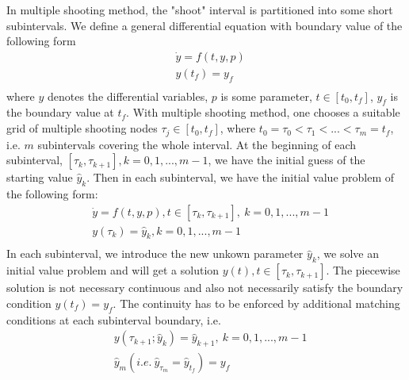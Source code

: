 \documentclass  [
  paper    = a4,
  BCOR     = 10mm,
  twoside,
  fontsize = 12pt,
  fleqn,
  toc      = bibnumbered,
  toc      = listofnumbered,
  numbers  = noendperiod,
  headings = normal,
  listof   = leveldown,
  version  = 3.03
]                                       {scrreprt}
\newcommand{\<}{\langle}
\renewcommand{\>}{\rangle}
\begin{document}
In multiple shooting method, the "shoot" interval is partitioned into some short subintervals. We define a general differential equation with boundary value of the following form
\begin{equation}\label{eqn:ori_dae}
	\begin{aligned}
		& \dot{y} = f(t, y, p) \\ 
		& y(t_f) = y_f  \\
	\end{aligned}
\end{equation}
where $y$ denotes the differential variables, $p$ is some parameter, $t \in [t_0, t_f]$,  $y_f$ is the boundary value at $t_f$.  With multiple shooting method, one chooses a suitable grid of multiple shooting nodes $\tau_j \in [t_0,t_f] $, where $t_0 = \tau_0 < \tau_1 < ... < \tau_m = t_f$,  i.e. $m$ subintervals covering the whole interval. At the beginning of each subinterval, $[\tau_k, \tau_{k+1}], k = 0, 1, ..., m-1$, we have the initial guess of the starting value $\hat{y}_k$. Then in each subinterval, we have the initial value problem of the following form: 
\begin{equation}\label{eqn:msh}
	\begin{aligned}
		& \dot{y} = f(t, y, p) , t \in [\tau_k, \tau_{k+1}], \ k = 0, 1, ..., m-1   \\ 
		& y(\tau_k) = \hat{y}_k, k = 0, 1, ..., m-1  \\
	\end{aligned}
\end{equation}
In each subinterval, we introduce the new unkown parameter $\hat{y}_k$, we solve an initial value problem and will get a solution $y(t), t \in [\tau_k, \tau_{k+1}]$. The piecewise solution is not necessary continuous and also not necessarily satisfy the boundary condition $y(t_f) = y_f$. The continuity has to be enforced by additional matching conditions at each subinterval boundary, i.e. 
\begin{equation}\label{eqn:mc}
	\begin{aligned}
		& y(\tau_{k+1}; \hat{y}_k) = \hat{y}_{k+1}, \  k = 0, 1, ..., m-1  \\
		& \hat{y}_{m} (i.e. \ \hat{y}_{\tau_m} = \hat{y}_{t_f}) =  y_f 
	\end{aligned}
\end{equation}
\end{document}
